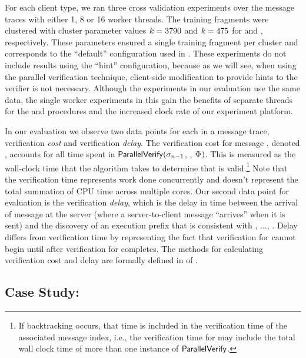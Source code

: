 For each client type, we ran three cross validation experiments over
the message traces with either 1, 8 or 16 worker threads. The training
fragments were clustered with cluster parameter values $k =
3790$ and $k = 475$
for \tetrinet and \xpilot, respectively. These parameters ensured a
single training fragment per cluster and corresponds to the
``default'' configuration used in . These experiments
do not include results using the ``hint'' configuration, because as we
will see, when using the parallel verification technique, client-side
modification to provide hints to the verifier is not necessary. 
Although the experiments in our evaluation use the same data, the
single worker experiments in this \paper gain the benefits of separate
threads for the \nodeScheduler and \clusterSelector procedures and the
increased clock rate of our experiment platform.

In our evaluation we observe two data points for each \msg{\msgNmbr} in
a message trace, verification \textit{cost} and verification
\textit{delay}. The verification cost for message \msg{\msgNmbr},
denoted \cost{\msgNmbr}, accounts for all time spent in
$\mathsf{ParallelVerify}(\sigma_{n-1}$, \msg{\msgNmbr},
$\Phi_{})$. This is measured as the wall-clock time that
the algorithm takes to determine that \msg{\msgNmbr} is
valid.\footnote{If backtracking occurs, that time is included in the
verification time of the associated message index, i.e., the verification time
for \msg{\msgNmbr} may include the total wall clock time of more than
one instance of $\mathsf{ParallelVerify}$.} Note that the verification time
represents work done concurrently and doesn't represent the total
summation of CPU time across multiple cores. Our second data point
for evaluation is the verification \textit{delay}, which is the delay
in time between the arrival of message \msg{\msgNmbr} at the server
(where a server-to-client message ``arrives'' when it is sent) and the
discovery of an execution prefix \execPrefix{\msgNmbr} that is
consistent with , $\ldots$, \msg{\msgNmbr}.  Delay differs from
verification time by representing the fact that verification for
\msg{\msgNmbr} cannot begin until after verification for 
completes.  The methods for calculating verification cost and delay
are formally defined in  of .

\subsection{Case Study: \tetrinet}

